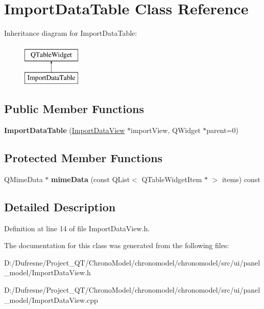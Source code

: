 \hypertarget{class_import_data_table}{\section{Import\-Data\-Table Class Reference}
\label{class_import_data_table}
}
Inheritance diagram for Import\-Data\-Table\-:\begin{figure}[H]
\begin{center}
\leavevmode
\includegraphics[height=2.000000cm]{class_import_data_table}
\end{center}
\end{figure}
\subsection*{Public Member Functions}
\begin{DoxyCompactItemize}
\item 
\hypertarget{class_import_data_table_afaf770da35838e1947388f392f1d8628}{{\bfseries Import\-Data\-Table} (\hyperlink{class_import_data_view}{Import\-Data\-View} $\ast$import\-View, Q\-Widget $\ast$parent=0)}\label{class_import_data_table_afaf770da35838e1947388f392f1d8628}

\end{DoxyCompactItemize}
\subsection*{Protected Member Functions}
\begin{DoxyCompactItemize}
\item 
\hypertarget{class_import_data_table_ab03d5895f8aea473baa4739b302b496b}{Q\-Mime\-Data $\ast$ {\bfseries mime\-Data} (const Q\-List$<$ Q\-Table\-Widget\-Item $\ast$ $>$ items) const }\label{class_import_data_table_ab03d5895f8aea473baa4739b302b496b}

\end{DoxyCompactItemize}


\subsection{Detailed Description}


Definition at line 14 of file Import\-Data\-View.\-h.



The documentation for this class was generated from the following files\-:\begin{DoxyCompactItemize}
\item 
D\-:/\-Dufresne/\-Project\-\_\-\-Q\-T/\-Chrono\-Model/chronomodel/chronomodel/src/ui/panel\-\_\-model/Import\-Data\-View.\-h\item 
D\-:/\-Dufresne/\-Project\-\_\-\-Q\-T/\-Chrono\-Model/chronomodel/chronomodel/src/ui/panel\-\_\-model/Import\-Data\-View.\-cpp\end{DoxyCompactItemize}
